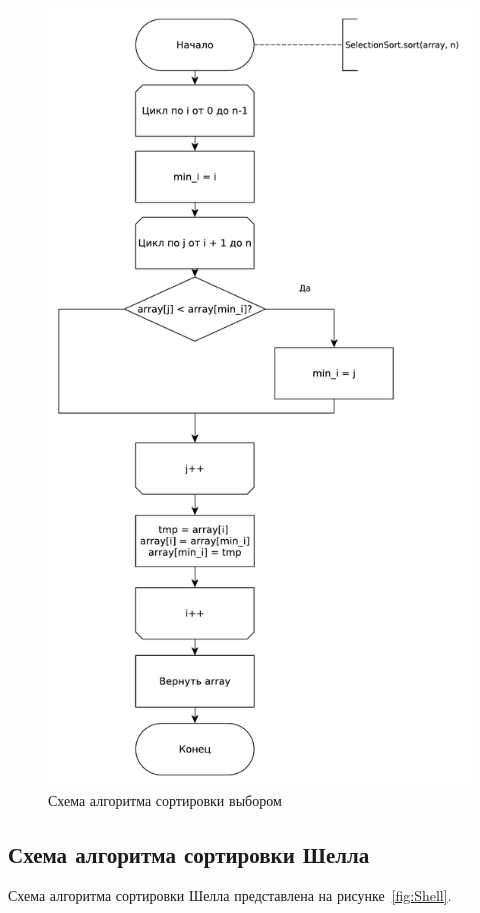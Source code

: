 \documentclass[12pt]{report}
\begin{document}
    \begin{figure}[H]
        \centering
        \includegraphics[width=0.68\linewidth]{img/SelectionSort}
        \caption{Схема алгоритма сортировки выбором}
        \label{fig:Selection}
    \end{figure}

    \subsection{Схема алгоритма сортировки Шелла}
    Схема алгоритма сортировки Шелла представлена на рисунке~\ref{fig:Shell}.
\end{document}
